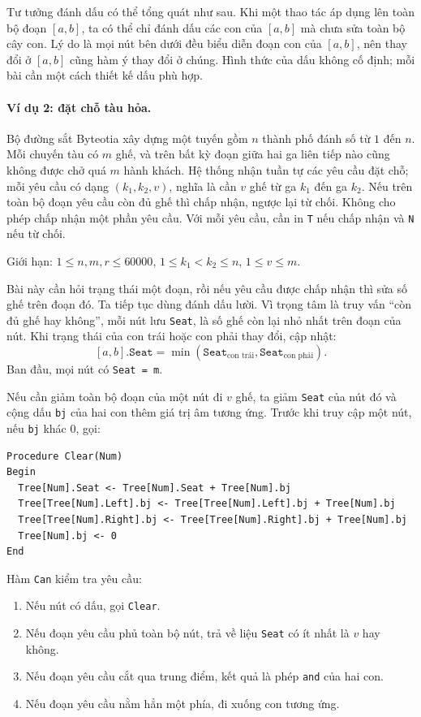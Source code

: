 \documentclass[11pt]{article}
\begin{document}
Tư tưởng đánh dấu có thể tổng quát như sau. Khi một thao tác áp dụng lên toàn
bộ đoạn $[a,b]$, ta có thể chỉ đánh dấu các con của $[a,b]$ mà chưa sửa toàn
bộ cây con. Lý do là mọi nút bên dưới đều biểu diễn đoạn con của $[a,b]$, nên
thay đổi ở $[a,b]$ cũng hàm ý thay đổi ở chúng. Hình thức của dấu không cố
định; mỗi bài cần một cách thiết kế dấu phù hợp.

\paragraph{Ví dụ 2: đặt chỗ tàu hỏa.}
Bộ đường sắt Byteotia xây dựng một tuyến gồm $n$ thành phố đánh số từ $1$ đến
$n$. Mỗi chuyến tàu có $m$ ghế, và trên bất kỳ đoạn giữa hai ga liên tiếp nào
cũng không được chở quá $m$ hành khách. Hệ thống nhận tuần tự các yêu cầu đặt
chỗ; mỗi yêu cầu có dạng $(k_1,k_2,v)$, nghĩa là cần $v$ ghế từ ga $k_1$ đến
ga $k_2$. Nếu trên toàn bộ đoạn yêu cầu còn đủ ghế thì chấp nhận, ngược lại
từ chối. Không cho phép chấp nhận một phần yêu cầu. Với mỗi yêu cầu, cần in
\texttt{T} nếu chấp nhận và \texttt{N} nếu từ chối.

Giới hạn: $1\le n,m,r\le 60000$, $1\le k_1<k_2\le n$, $1\le v\le m$.

Bài này cần hỏi trạng thái một đoạn, rồi nếu yêu cầu được chấp nhận thì sửa
số ghế trên đoạn đó. Ta tiếp tục dùng đánh dấu lười. Vì trọng tâm là truy vấn
``còn đủ ghế hay không'', mỗi nút lưu \texttt{Seat}, là số ghế còn lại nhỏ
nhất trên đoạn của nút. Khi trạng thái của con trái hoặc con phải thay đổi,
cập nhật:
\[
  [a,b].\texttt{Seat}
  =\min(\texttt{Seat}_{\text{con trái}},\texttt{Seat}_{\text{con phải}}).
\]
Ban đầu, mọi nút có \texttt{Seat = m}.

Nếu cần giảm toàn bộ đoạn của một nút đi $v$ ghế, ta giảm \texttt{Seat} của
nút đó và cộng dấu \texttt{bj} của hai con thêm giá trị âm tương ứng. Trước
khi truy cập một nút, nếu \texttt{bj} khác $0$, gọi:
\begin{verbatim}
Procedure Clear(Num)
Begin
  Tree[Num].Seat <- Tree[Num].Seat + Tree[Num].bj
  Tree[Tree[Num].Left].bj <- Tree[Tree[Num].Left].bj + Tree[Num].bj
  Tree[Tree[Num].Right].bj <- Tree[Tree[Num].Right].bj + Tree[Num].bj
  Tree[Num].bj <- 0
End
\end{verbatim}

Hàm \texttt{Can} kiểm tra yêu cầu:
\begin{enumerate}
  \item Nếu nút có dấu, gọi \texttt{Clear}.
  \item Nếu đoạn yêu cầu phủ toàn bộ nút, trả về liệu \texttt{Seat} có ít
  nhất là $v$ hay không.
  \item Nếu đoạn yêu cầu cắt qua trung điểm, kết quả là phép \texttt{and} của
  hai con.
  \item Nếu đoạn yêu cầu nằm hẳn một phía, đi xuống con tương ứng.
\end{enumerate}
\end{document}
